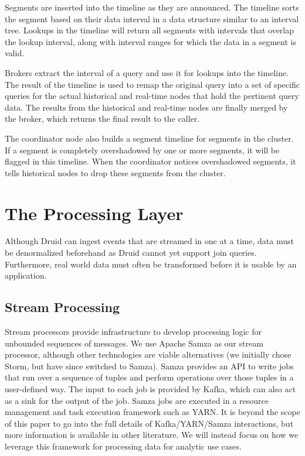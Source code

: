 \documentclass{vldb}
\begin{document}
Segments are inserted into the timeline as they are announced. The timeline
sorts the segment based on their data interval in a data structure similar to
an interval tree. Lookups in the timeline will return all segments with
intervals that overlap the lookup interval, along with interval ranges for
which the data in a segment is valid. 

Brokers extract the interval of a query and use it for lookups into the
timeline. The result of the timeline is used to remap the original query into a
set of specific queries for the actual historical and real-time nodes that hold
the pertinent query data. The results from the historical and real-time nodes
are finally merged by the broker, which returns the final result to the caller.

The coordinator node also builds a segment timeline for segments in the
cluster. If a segment is completely overshadowed by one or more segments, it
will be flagged in this timeline. When the coordinator notices overshadowed
segments, it tells historical nodes to drop these segments from the cluster.

\section{The Processing Layer}
\label{sec:processing}
Although Druid can ingest events that are streamed in one at a time, data must
be denormalized beforehand as Druid cannot yet support
join queries. Furthermore, real world data must often be transformed before it
is usable by an application.

\subsection{Stream Processing}
\label{sec:streamprocessing}
Stream processors provide infrastructure to develop processing logic for
unbounded sequences of messages. We use Apache Samza as our stream processor,
although other technologies are viable alternatives (we initially chose Storm,
but have since switched to Samza). Samza provides an API to write jobs that run
over a sequence of tuples and perform operations over those tuples in a
user-defined way. The input to each job is provided by Kafka, which can also
act as a sink for the output of the job. Samza jobs are executed in a resource
management and task execution framework such as
YARN\cite{vavilapalli2013apache}. It is beyond the scope of this paper to go
into the full details of Kafka/YARN/Samza interactions, but more information is
available in other literature\cite{2014samza}. We will instead focus on how we
leverage this framework for processing data for analytic use cases.
\end{document}
